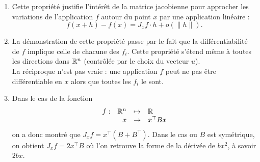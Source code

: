 \remarks
\begin{enumerate}
  \item Cette propriété justifie l'intérêt de la matrice jacobienne pour approcher les variations de l'application $f$ autour du point $x$ par une application linéaire : 
  $$
  f(x+h) - f(x) = J_xf \cdot h + o(\|h\|).
  $$
  \item La démonstration de cette propriété passe par le fait que la différentiabilité de $f$ implique celle de chacune des $f_i$. Cette propriété s'étend même à toutes les directions dans $\mathbb{R}^n$ (contrôlée par le choix du vecteur $u$). \\
  La réciproque n'est pas vraie : une application $f$ peut ne pas être différentiable en $x$ alors que toutes les $f_i$ le sont.
  \item Dans le cas de la fonction
  $$
  \begin{array}{rrcl}
    f : & \mathbb{R}^n & \mapsto & \mathbb{R} \\
    & x & \to & x^\top B x
  \end{array}
  $$
  on a donc montré que $J_x f = x^\top (B + B^\top)$. Dans le cas ou $B$ est symétrique, on obtient $J_x f = 2 x^\top B$ où l'on retrouve la forme de la dérivée de $bx^2$, à savoir $2 bx$.

\end{enumerate}


